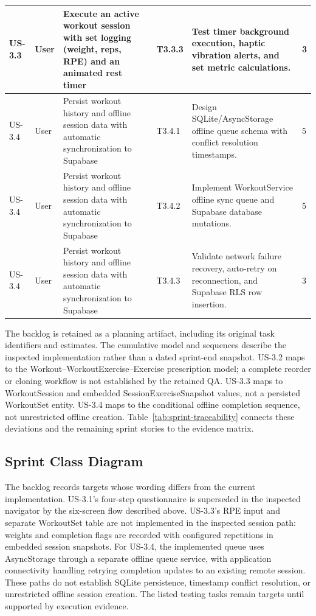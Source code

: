 \documentclass[12pt,a4paper,openany]{report}
\begin{document}
\begin{longtable}{|L{1.00cm}|L{0.95cm}|L{4.80cm}|L{1.20cm}|L{6.20cm}|L{1.60cm}|}
US-3.3 & User & Execute an active workout session with set logging (weight, reps, RPE) and an animated rest timer & T3.3.3 & Test timer background execution, haptic vibration alerts, and set metric calculations. & 3 \\ \hline
US-3.4 & User & Persist workout history and offline session data with automatic synchronization to Supabase & T3.4.1 & Design SQLite/AsyncStorage offline queue schema with conflict resolution timestamps. & 5 \\ \hline
US-3.4 & User & Persist workout history and offline session data with automatic synchronization to Supabase & T3.4.2 & Implement WorkoutService offline sync queue and Supabase database mutations. & 5 \\ \hline
US-3.4 & User & Persist workout history and offline session data with automatic synchronization to Supabase & T3.4.3 & Validate network failure recovery, auto-retry on reconnection, and Supabase RLS row insertion. & 3 \\ \hline
\end{longtable}
\endgroup

The backlog is retained as a planning artifact, including its original task identifiers and estimates. The cumulative model and sequences describe the inspected implementation rather than a dated sprint-end snapshot. US-3.2 maps to the Workout--WorkoutExercise--Exercise prescription model; a complete reorder or cloning workflow is not established by the retained QA. US-3.3 maps to WorkoutSession and embedded SessionExerciseSnapshot values, not a persisted WorkoutSet entity. US-3.4 maps to the conditional offline completion sequence, not unrestricted offline creation. Table~\ref{tab:sprint-traceability} connects these deviations and the remaining sprint stories to the evidence matrix.

\subsection{Sprint Class Diagram}

The backlog records targets whose wording differs from the current implementation. US-3.1's four-step questionnaire is superseded in the inspected navigator by the six-screen flow described above. US-3.3's RPE input and separate WorkoutSet table are not implemented in the inspected session path: weights and completion flags are recorded with configured repetitions in embedded session snapshots. For US-3.4, the implemented queue uses AsyncStorage through a separate offline queue service, with application connectivity handling retrying completion updates to an existing remote session. These paths do not establish SQLite persistence, timestamp conflict resolution, or unrestricted offline session creation. The listed testing tasks remain targets until supported by execution evidence.
\end{document}
